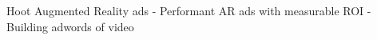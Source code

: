 \documentclass[10pt]{beamer}
\begin{document}

\begin{frame}{Hoot Augmented Reality ads - Performant AR ads with  measurable ROI - Building adwords of video}
	
 	
\end{frame}
\end{document}

